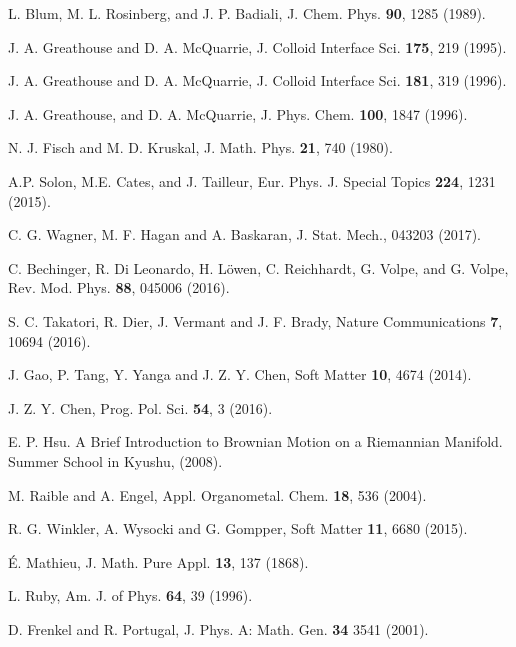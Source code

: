 \documentclass[pre,twocolumn,graphicx]{revtex4-1}
\begin{document}
\begin{thebibliography}{99}
L. Blum, M. L. Rosinberg, and J. P. Badiali, J. Chem. Phys. {\bf 90}, 1285 (1989).  

J. A. Greathouse and D. A. McQuarrie, J. Colloid Interface Sci. {\bf 175}, 219 (1995).

J. A. Greathouse and D. A. McQuarrie, J. Colloid Interface Sci. {\bf 181}, 319 (1996).

J. A. Greathouse, and D. A. McQuarrie,  J. Phys. Chem. {\bf 100}, 1847 (1996).







N. J. Fisch and M. D. Kruskal, J. Math. Phys. {\bf 21}, 740 (1980).

A.P.  Solon, M.E. Cates, and J. Tailleur, Eur. Phys. J. Special Topics {\bf 224}, 1231 (2015).  

C. G. Wagner, M. F. Hagan and A. Baskaran, J. Stat. Mech., 043203 (2017).



C. Bechinger, R. Di Leonardo, H. L\"owen, C. Reichhardt, G. Volpe, and G. Volpe, Rev. Mod. Phys. {\bf 88}, 045006 (2016).




S. C. Takatori, R. Dier, J. Vermant and J. F. Brady, Nature Communications {\bf 7}, 10694 (2016).



J. Gao, P. Tang, Y. Yanga and J. Z. Y. Chen, Soft Matter {\bf 10}, 4674 (2014).

J. Z. Y. Chen, Prog. Pol. Sci. {\bf 54}, 3 (2016).



E. P. Hsu. A Brief Introduction to Brownian Motion on a Riemannian Manifold. Summer School in Kyushu, (2008).

M. Raible and A. Engel, Appl. Organometal. Chem. {\bf 18}, 536 (2004).

R. G. Winkler, A. Wysocki and G. Gompper, Soft Matter {\bf 11}, 6680 (2015).



\'E. Mathieu, J. Math. Pure Appl. {\bf 13}, 137 (1868).

L. Ruby, Am. J. of Phys. {\bf 64}, 39 (1996). 

D. Frenkel and R. Portugal, J. Phys. A: Math. Gen. {\bf 34} 3541 (2001).













\end{thebibliography}
\end{document}

